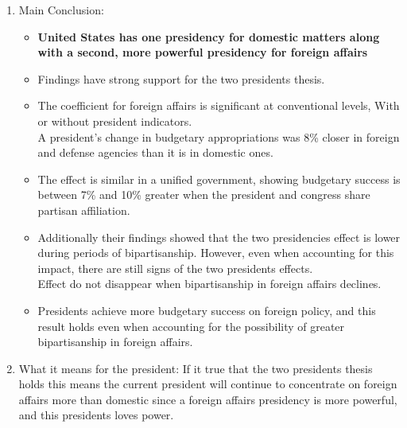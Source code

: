 \documentclass{article}
\begin{document}
\begin{enumerate}
    \begin{enumerate}
        \item \color{red} Main Conclusion: \color{black}
        \begin{itemize}
            \item \textbf{United States has one presidency for domestic matters along  with  a  second,  more  powerful  presidency  for foreign  affairs}
            \item Findings have strong support for the two presidents thesis. 
            \item The coefficient for foreign affairs is significant at conventional levels, With or without president indicators. \\
            A president's change in budgetary appropriations was 8\% closer in foreign and defense agencies than it is in domestic ones. 
            \item The effect is similar in a unified government, showing budgetary success is between 7\% and 10\% greater when the president and congress share
            partisan affiliation.
            \item Additionally their findings showed that the two presidencies effect is lower during periods of bipartisanship. However, even when accounting for this impact, there are still signs of the two presidents effects. \\
            Effect do not disappear when bipartisanship in foreign affairs declines. 
            \item Presidents achieve more budgetary success on foreign policy, and this result holds even when accounting for the possibility of greater bipartisanship in 
            foreign affairs. 
            
        \end{itemize}
        \item \color{red} What it means for the president: \color{black} If it true that the two presidents thesis holds this means the current president will continue to concentrate on foreign affairs more than domestic since a foreign affairs presidency is more powerful, and this presidents loves power. 
    \end{enumerate}
    \color{black}

\end{enumerate}
\end{document}
